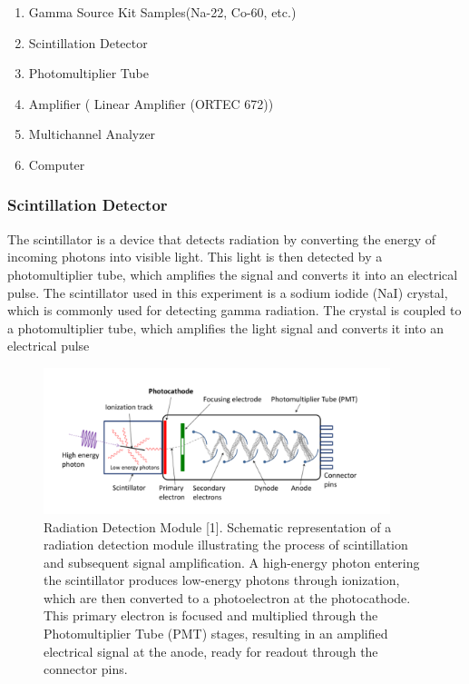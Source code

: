 \documentclass[12pt]{article}
\begin{document}
                        \begin{enumerate}
                                \item Gamma Source Kit Samples(Na-22, Co-60, etc.)
                                \item Scintillation Detector
                                \item Photomultiplier Tube
                                \item Amplifier ( Linear Amplifier (ORTEC 672))
                                \item Multichannel Analyzer
                                \item Computer
                        \end{enumerate}
                        
                \subsubsection{Scintillation Detector}
                        The scintillator is a device that detects radiation by converting the energy of incoming
                        photons into visible light. This light is then detected by a photomultiplier tube, which
                        amplifies the signal and converts it into an electrical pulse. The scintillator used in
                        this experiment is a sodium iodide (NaI) crystal, which is commonly used for detecting
                        gamma radiation. The crystal is coupled to a photomultiplier tube, which amplifies the
                        light signal and converts it into an electrical pulse
                

                \begin{figure}[!htb]
                        \centering
                        \includegraphics[width=0.9\textwidth]{./img/other/module.png}
                        \caption{Radiation Detection Module [1].  Schematic representation of a radiation detection module illustrating the process of scintillation and subsequent signal amplification. A high-energy photon entering the scintillator produces low-energy photons through ionization, which are then converted to a photoelectron at the photocathode. This primary electron is focused and multiplied through the Photomultiplier Tube (PMT) stages, resulting in an amplified electrical signal at the anode, ready for readout through the connector pins.}
                        \label{fig:Radiation Detection Module [1]}
                \end{figure}
\end{document}
